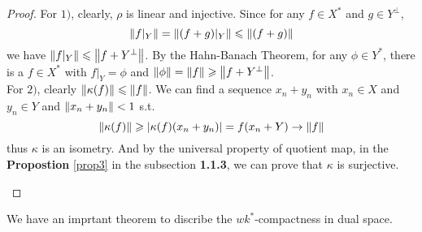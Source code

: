 \documentclass[a4paper,11pt]{report}
\begin{document}
\begin{proof}
	For $1)$, clearly, $\rho$ is linear and injective. Since for any $f \in X^{*}$ and $g \in Y^{\bot}$, 
	\begin{equation*}
		\left\lVert f|_Y\right\lVert = \left\lVert(f+g)|_Y\right\lVert \leqslant \left\lVert(f+g)\right\lVert
	\end{equation*}
	we have $\left\lVert f|_Y\right\lVert \leqslant \left\lVert f+Y^{\bot}\right\lVert$. By the Hahn-Banach Theorem, for any $\phi \in Y^{*}$, there is a $f \in X^{*}$ with $f|_Y = \phi$ and $\left\lVert\phi\right\lVert = \left\lVert f\right\lVert \geqslant \left\lVert f+Y^{\bot}\right\lVert$.\\
	For $2)$, clearly $\left\lVert\kappa(f)\right\lVert \leqslant \left\lVert f\right\lVert$. We can find a sequence ${x_n+y_n}$ with $x_n \in X$ and $y_n \in Y$ and $\left\lVert x_n+y_n\right\lVert<1$ s.t. 
	\begin{equation*}
		\left\lVert\kappa(f)\right\lVert \geqslant \left\lvert\kappa(f)(x_n+y_n)\right\lvert=f(x_n+Y) \rightarrow \left\lVert f\right\lVert 
	\end{equation*}
	thus $\kappa$ is an isometry. And by the universal property of quotient map, in the \textbf{Propostion} \ref{prop3} in the subsection \textbf{1.1.3}, we can prove that $\kappa$ is surjective.
	\begin{center}
\end{center}
\end{proof}

We have an imprtant theorem to discribe the $wk^{*}$-compactness in dual space.
\end{document}
